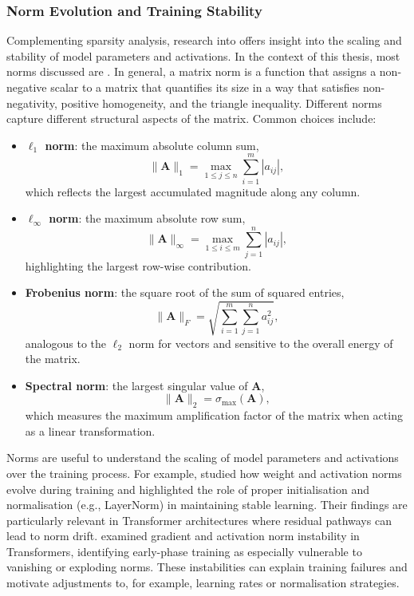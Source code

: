 \subsubsection{Norm Evolution and Training Stability}

Complementing sparsity analysis, research into  offers insight into the scaling and stability of model parameters and activations. In the context of this thesis, most norms discussed are . In general, a matrix norm is a function that assigns a non-negative scalar to a matrix that quantifies its size in a way that satisfies non-negativity, positive homogeneity, and the triangle inequality. Different norms capture different structural aspects of the matrix. Common choices include:

\begin{itemize}
    \item \textbf{$\ell_1$ norm}: the maximum absolute column sum,
    \[
    \|\mathbf{A}\|_1 = \max_{1 \leq j \leq n} \sum_{i=1}^m |a_{ij}|,
    \]
    which reflects the largest accumulated magnitude along any column.
    \item \textbf{$\ell_\infty$ norm}: the maximum absolute row sum,
    \[
    \|\mathbf{A}\|_\infty = \max_{1 \leq i \leq m} \sum_{j=1}^n |a_{ij}|,
    \]
    highlighting the largest row-wise contribution.
    \item \textbf{Frobenius norm}: the square root of the sum of squared entries,
    \[
    \|\mathbf{A}\|_F = \sqrt{\sum_{i=1}^m \sum_{j=1}^n a_{ij}^2},
    \]
    analogous to the $\ell_2$ norm for vectors and sensitive to the overall energy of the matrix.
    \item \textbf{Spectral norm}: the largest singular value of $\mathbf{A}$,
    \[
    \|\mathbf{A}\|_2 = \sigma_{\max}(\mathbf{A}),
    \]
    which measures the maximum amplification factor of the matrix when acting as a linear transformation.
\end{itemize}

Norms are useful to understand the scaling of model parameters and activations over the training process. For example, \citet{mishkin2016goodinit} studied how weight and activation norms evolve during training and highlighted the role of proper initialisation and normalisation (e.g., LayerNorm) in maintaining stable learning. Their findings are particularly relevant in Transformer architectures where residual pathways can lead to norm drift. \citet{liu2020understanding} examined gradient and activation norm instability in Transformers, identifying early-phase training as especially vulnerable to vanishing or exploding norms. These instabilities can explain training failures and motivate adjustments to, for example, learning rates or normalisation strategies. 


